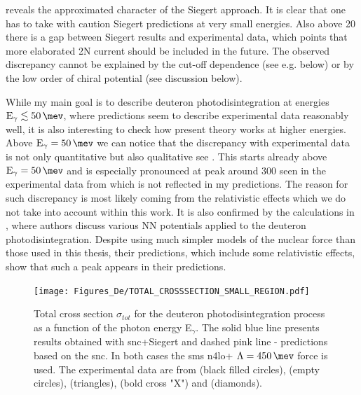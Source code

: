      reveals the approximated character of the Siegert approach.
    It is clear that one has to take with caution Siegert predictions at very small energies.
    Also above \SI{20}{\mev} there is a gap between Siegert results and experimental data,
    which points that more elaborated 2N current should be included in the future.
    The observed discrepancy cannot be explained by the cut-off dependence
    (see e.g.  below) or by the low order of chiral potential (see discussion below).

    While my main goal is to describe deuteron photodisintegration
    at energies $\text{E}_\gamma \lesssim \SI{50}{\mev}$, 
    where predictions seem to describe experimental data reasonably well,
    it is also interesting to check how 
    present theory works at higher energies.
    Above $\text{E}_\gamma=\SI{50}{\mev}$
    we can notice that the discrepancy with experimental data is not only 
    quantitative but also qualitative see .  
    This starts already above $\text{E}_\gamma=\SI{50}{\mev}$ and is especially pronounced at peak around \SI{300}{\mev}
    seen in the experimental data from \cite{Bernabei1986} which is not
    reflected in my predictions. The reason for such discrepancy 
    is most likely coming from the relativistic effects
    which we do not take into account within this work.
    It is also confirmed by the calculations in \cite{ArenhovelPhotodisint1991},
    where authors discuss various NN potentials applied to the deuteron photodisintegration.
    Despite using much simpler models of the nuclear force than those used in this thesis,
    their predictions, which include some relativistic effects, show that such a peak appears in their predictions. 
    
    \begin{figure}[h]
        \begin{center}
        \texttt{[image: Figures\_De/TOTAL\_CROSSSECTION\_SMALL\_REGION.pdf]}
        \end{center}
        \caption{Total cross section $\sigma_{tot}$ for the deuteron photodisintegration process
        as a function of the photon energy E$_\gamma$.
        The solid blue line presents results obtained with \gls{snc}+Siegert 
        and dashed pink line - predictions based on the \gls{snc}.
        In both cases the \gls{sms} \gls{n4lo+} $\Lambda=\SI{450}{\mev}$ force is used.
        The experimental data are from \cite{Bernabei1986} (black filled circles),
        \cite{BOSMAN1979} (empty circles),
        \cite{Skopik1974} (triangles),
        \cite{Moreh1989} (bold cross "X") and
        \cite{Birenbaum1985} (diamonds).
        }
        \label{TOTAL_CROSS_small}
    \end{figure}

